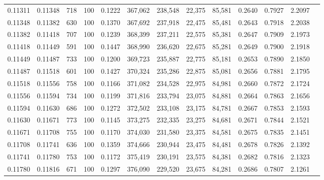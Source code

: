 \begin{tabular}{rrrrrrrrrrrrr}
0.11311 & 0.11348 &   718 & 100 &                                     0.1222 & 367,062 & 238,548 &  22,375 &  85,581 & 0.2640 & 0.7927 & 2.2097 \\
0.11348 & 0.11382 &   630 & 100 &                                     0.1370 & 367,692 & 237,918 &  22,475 &  85,481 & 0.2643 & 0.7918 & 2.2038 \\
0.11382 & 0.11418 &   707 & 100 &                                     0.1239 & 368,399 & 237,211 &  22,575 &  85,381 & 0.2647 & 0.7909 & 2.1973 \\
0.11418 & 0.11449 &   591 & 100 &                                     0.1447 & 368,990 & 236,620 &  22,675 &  85,281 & 0.2649 & 0.7900 & 2.1918 \\
0.11449 & 0.11487 &   733 & 100 &                                     0.1200 & 369,723 & 235,887 &  22,775 &  85,181 & 0.2653 & 0.7890 & 2.1850 \\
0.11487 & 0.11518 &   601 & 100 &                                     0.1427 & 370,324 & 235,286 &  22,875 &  85,081 & 0.2656 & 0.7881 & 2.1795 \\
0.11518 & 0.11556 &   758 & 100 &                                     0.1166 & 371,082 & 234,528 &  22,975 &  84,981 & 0.2660 & 0.7872 & 2.1724 \\
0.11556 & 0.11594 &   734 & 100 &                                     0.1199 & 371,816 & 233,794 &  23,075 &  84,881 & 0.2664 & 0.7863 & 2.1656 \\
0.11594 & 0.11630 &   686 & 100 &                                     0.1272 & 372,502 & 233,108 &  23,175 &  84,781 & 0.2667 & 0.7853 & 2.1593 \\
0.11630 & 0.11671 &   773 & 100 &                                     0.1145 & 373,275 & 232,335 &  23,275 &  84,681 & 0.2671 & 0.7844 & 2.1521 \\
0.11671 & 0.11708 &   755 & 100 &                                     0.1170 & 374,030 & 231,580 &  23,375 &  84,581 & 0.2675 & 0.7835 & 2.1451 \\
0.11708 & 0.11741 &   636 & 100 &                                     0.1359 & 374,666 & 230,944 &  23,475 &  84,481 & 0.2678 & 0.7826 & 2.1392 \\
0.11741 & 0.11780 &   753 & 100 &                                     0.1172 & 375,419 & 230,191 &  23,575 &  84,381 & 0.2682 & 0.7816 & 2.1323 \\
0.11780 & 0.11816 &   671 & 100 &                                     0.1297 & 376,090 & 229,520 &  23,675 &  84,281 & 0.2686 & 0.7807 & 2.1261 \\

\end{tabular}
